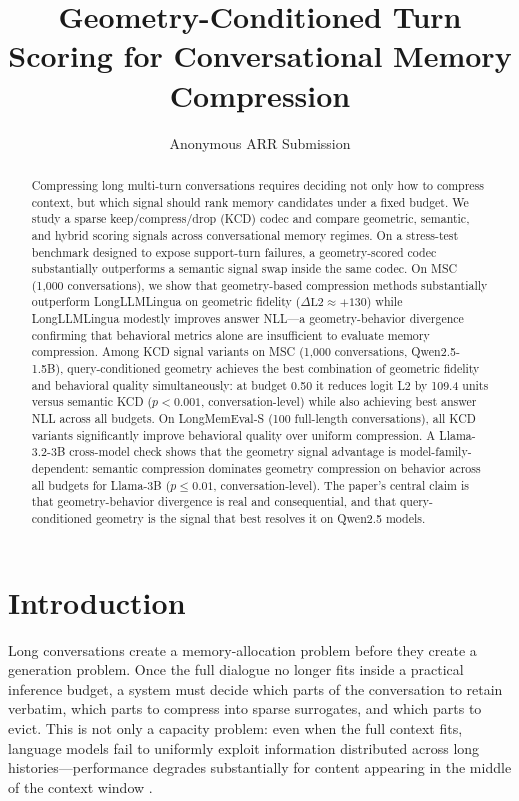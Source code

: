 \documentclass[11pt]{article}
\title{Geometry-Conditioned Turn Scoring for Conversational Memory Compression}
\author{Anonymous ARR Submission}
\begin{document}
\maketitle

\begin{abstract}
Compressing long multi-turn conversations requires deciding not only how to compress context, but which signal should rank memory candidates under a fixed budget. We study a sparse keep/compress/drop (KCD) codec and compare geometric, semantic, and hybrid scoring signals across conversational memory regimes. On a stress-test benchmark designed to expose support-turn failures, a geometry-scored codec substantially outperforms a semantic signal swap inside the same codec. On MSC (1{,}000 conversations), we show that geometry-based compression methods substantially outperform LongLLMLingua on geometric fidelity ($\Delta\mathrm{L2} \approx +130$) while LongLLMLingua modestly improves answer NLL---a geometry-behavior divergence confirming that behavioral metrics alone are insufficient to evaluate memory compression. Among KCD signal variants on MSC (1{,}000 conversations, Qwen2.5-1.5B), query-conditioned geometry achieves the best combination of geometric fidelity and behavioral quality simultaneously: at budget 0.50 it reduces logit L2 by 109.4 units versus semantic KCD ($p<0.001$, conversation-level) while also achieving best answer NLL across all budgets. On LongMemEval-S (100 full-length conversations), all KCD variants significantly improve behavioral quality over uniform compression. A Llama-3.2-3B cross-model check shows that the geometry signal advantage is model-family-dependent: semantic compression dominates geometry compression on behavior across all budgets for Llama-3B ($p\le 0.01$, conversation-level). The paper's central claim is that geometry-behavior divergence is real and consequential, and that query-conditioned geometry is the signal that best resolves it on Qwen2.5 models.
\end{abstract}

\section{Introduction}
Long conversations create a memory-allocation problem before they create a generation problem. Once the full dialogue no longer fits inside a practical inference budget, a system must decide which parts of the conversation to retain verbatim, which parts to compress into sparse surrogates, and which parts to evict. This is not only a capacity problem: even when the full context fits, language models fail to uniformly exploit information distributed across long histories---performance degrades substantially for content appearing in the middle of the context window \cite{lost-in-the-middle}.
\end{document}
